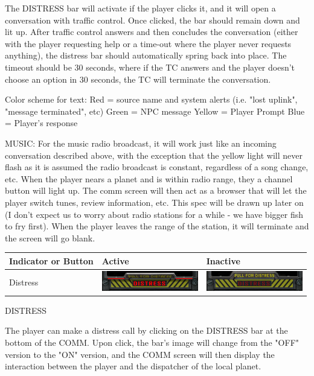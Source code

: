 The DISTRESS bar will activate if the player clicks it, and it will open a
conversation with traffic control. Once clicked, the bar should remain down
and lit up. After traffic control answers and then concludes the conversation
(either with the player requesting help or a time-out where the player never
requests anything), the distress bar should automatically spring back into
place. The timeout should be 30 seconds, where if the TC answers and the
player doesn't choose an option in 30 seconds, the TC will terminate the
conversation.

Color scheme for text:
Red = source name and system alerts (i.e. "lost uplink", "message terminated",
etc)
Green = NPC message
Yellow = Player Prompt
Blue = Player's response


MUSIC: 
For the music radio broadcast, it will work just like an incoming
conversation described above, with the exception that the yellow light will
never flash as it is assumed the radio broadcast is constant, regardless of a
song change, etc. When the player nears a planet and is within radio range,
they a channel button will light up. The comm screen will then act as a
browser that will let the player switch tunes, review information, etc. This
spec will be drawn up later on  (I don't expect us to worry about radio
stations for a while - we have bigger fish to fry first). When the player
leaves the range of the station, it will terminate and the screen will go
blank.


\begin{tabular}{ | l | l | l | }
\hline
Indicator or Button & Active & Inactive \\
\hline
Distress & \includegraphics[scale=0.5]{images/distress_on.png} & \includegraphics[scale=0.5]{images/distress_off.png} \\
\hline
\end{tabular}

DISTRESS 

The player can make a distress call by clicking on the DISTRESS bar at the bottom of the COMM. Upon click, the bar's image will change from the "OFF" version to the "ON" version, and the COMM screen will then display the interaction between the player and the dispatcher of the local planet. 

